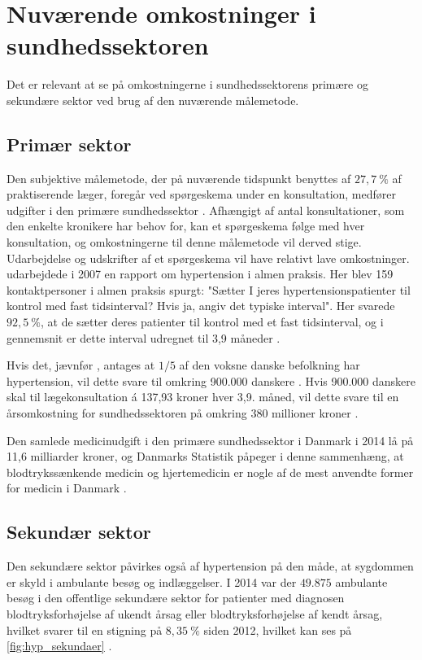 \section{Nuværende omkostninger i sundhedssektoren}
Det er relevant at se på omkostningerne i sundhedssektorens primære og sekundære sektor ved brug af den nuværende målemetode. 

\subsection{Primær sektor} \label{sec:nuv_primaer}
Den subjektive målemetode, der på nuværende tidspunkt benyttes af $27,7~\%$ af praktiserende læger, foregår ved spørgeskema under en konsultation, medfører udgifter i den primære sundhedssektor \citep{munck2007}. Afhængigt af antal konsultationer, som den enkelte kronikere har behov for, kan et spørgeskema følge med hver konsultation, og omkostningerne til denne målemetode vil derved stige. Udarbejdelse og udskrifter af et spørgeskema vil have relativt lave omkostninger.
\citeauthor{munck2007} udarbejdede i 2007 en rapport om hypertension i almen praksis. Her blev 159 kontaktpersoner i almen praksis spurgt: "Sætter I jeres hypertensionspatienter til kontrol med fast tidsinterval? Hvis ja, angiv det typiske interval". Her svarede $92,5~\%$, at de sætter deres patienter til kontrol med et fast tidsinterval, og i gennemsnit er dette interval udregnet til 3,9 måneder \citep{munck2007}. 

Hvis det, jævnfør \citeauthor{kronborg2008}, antages at $1/5$ af den voksne danske befolkning har hypertension, vil dette svare til omkring 900.000 danskere \citep{folketal2016}. Hvis 900.000 danskere skal til lægekonsultation á 137,93 kroner hver 3,9. måned, vil dette svare til en årsomkostning for sundhedssektoren på omkring 380 millioner kroner \citep{honorartabel2016}. 

Den samlede medicinudgift i den primære sundhedssektor i Danmark i 2014 lå på 11,6 milliarder kroner, og Danmarks Statistik påpeger i denne sammenhæng, at blodtrykssænkende medicin og hjertemedicin er nogle af de mest anvendte former for medicin i Danmark \citep{dst2016}. 

\subsection{Sekundær sektor}
Den sekundære sektor påvirkes også af hypertension på den måde, at sygdommen er skyld i ambulante besøg og indlæggelser. I 2014 var der $49.875$ ambulante besøg i den offentlige sekundære sektor for patienter med diagnosen blodtryksforhøjelse af ukendt årsag eller blodtryksforhøjelse af kendt årsag, hvilket svarer til en stigning på $8,35~\%$ siden 2012, hvilket kan ses på \autoref{fig:hyp_sekundaer} \citep{sundhedsdatastyrelsen2016}. 

